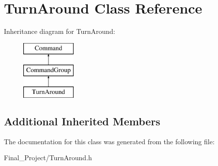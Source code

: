 \hypertarget{classTurnAround}{\section{Turn\-Around Class Reference}
\label{classTurnAround}
}
Inheritance diagram for Turn\-Around\-:\begin{figure}[H]
\begin{center}
\leavevmode
\includegraphics[height=3.000000cm]{classTurnAround}
\end{center}
\end{figure}
\subsection*{Additional Inherited Members}


The documentation for this class was generated from the following file\-:\begin{DoxyCompactItemize}
\item 
Final\-\_\-\-Project/Turn\-Around.\-h\end{DoxyCompactItemize}
